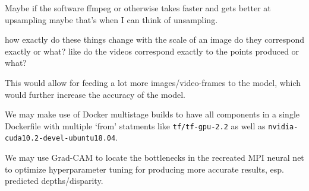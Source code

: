 Maybe if the software ffmpeg or otherwise takes faster and gets better at upsampling maybe that's when I can think of unsampling.

how exactly do these things change with the scale of an image 
do they correspond exactly or what? like do the videos correspond exactly to the points produced or what?

This would allow for feeding a lot more images/video-frames to the model, which would further increase the accuracy of the model.

We may make use of Docker multistage builds to have all components in a single Dockerfile with multiple `from' statments like \texttt{tf/tf-gpu-2.2} as well as \texttt{nvidia-cuda10.2-devel-ubuntu18.04}.

 We may use Grad-CAM to locate the bottlenecks in the recreated MPI neural net to optimize hyperparameter tuning for producing more accurate results, esp. predicted depths/disparity.